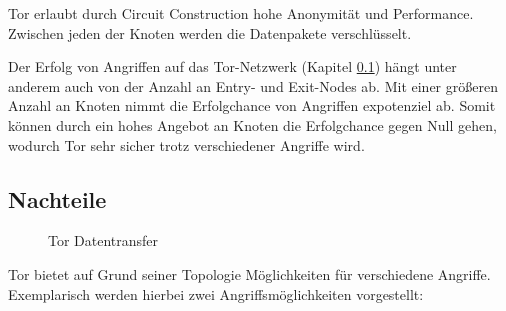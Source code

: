 Tor erlaubt durch Circuit Construction hohe Anonymität und Performance. Zwischen jeden der Knoten werden die Datenpakete verschlüsselt.

Der Erfolg von Angriffen auf das Tor-Netzwerk (Kapitel \ref{chap:tor_disatvantages}) hängt unter anderem auch von der Anzahl an Entry- und Exit-Nodes ab. Mit einer größeren Anzahl an Knoten nimmt die Erfolgchance von Angriffen expotenziel ab. Somit können durch ein hohes Angebot an Knoten die Erfolgchance gegen Null gehen, wodurch Tor sehr sicher trotz verschiedener Angriffe wird.

\subsection{Nachteile}
\label{chap:tor_disatvantages}

\begin{figure}[h!]
    \centering
    
    \caption{Tor Datentransfer}
    \label{imgs:tor_transfer}
\end{figure}

Tor bietet auf Grund seiner Topologie Möglichkeiten für verschiedene Angriffe. Exemplarisch werden hierbei zwei Angriffsmöglichkeiten vorgestellt:


